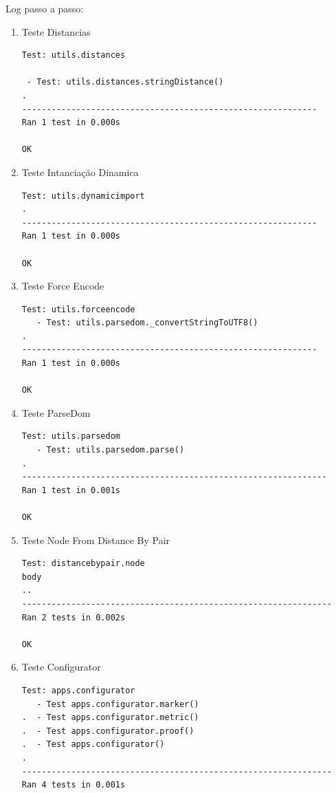 \documentclass[12pt, a4paper]{article}
\begin{document}
Log passo a passo:
\begin{enumerate}

\item Teste Distancias

\begin{verbatim}
Test: utils.distances

 - Test: utils.distances.stringDistance()
.
------------------------------------------------------------
Ran 1 test in 0.000s

OK
\end{verbatim}

\item Teste Intanciação Dinamica

\begin{verbatim}
Test: utils.dynamicimport
.
------------------------------------------------------------
Ran 1 test in 0.000s

OK
\end{verbatim}

\item Teste Force Encode

\begin{verbatim}
Test: utils.forceencode
   - Test: utils.parsedom._convertStringToUTF8()
.
------------------------------------------------------------
Ran 1 test in 0.000s

OK
\end{verbatim}

\item Teste ParseDom
\begin{verbatim}
Test: utils.parsedom
   - Test: utils.parsedom.parse()
.
--------------------------------------------------------------
Ran 1 test in 0.001s

OK
\end{verbatim}

\item  Teste Node From Distance By Pair

\begin{verbatim}
Test: distancebypair.node
body
..
---------------------------------------------------------------
Ran 2 tests in 0.002s

OK
\end{verbatim}

\item Teste Configurator

\begin{verbatim}
Test: apps.configurator
   - Test apps.configurator.marker()
.  - Test apps.configurator.metric()
.  - Test apps.configurator.proof()
.  - Test apps.configurator()
.
---------------------------------------------------------------
Ran 4 tests in 0.001s


\end{verbatim}
\end{enumerate}
\end{document}
